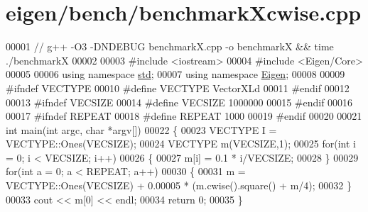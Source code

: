 \hypertarget{eigen_2bench_2benchmark_xcwise_8cpp_source}{}\section{eigen/bench/benchmark\+Xcwise.cpp}
\label{eigen_2bench_2benchmark_xcwise_8cpp_source}

\begin{DoxyCode}
00001 \textcolor{comment}{// g++ -O3 -DNDEBUG benchmarkX.cpp -o benchmarkX && time ./benchmarkX}
00002 
00003 \textcolor{preprocessor}{#include <iostream>}
00004 \textcolor{preprocessor}{#include <Eigen/Core>}
00005 
00006 \textcolor{keyword}{using namespace }\hyperlink{namespacestd}{std};
00007 \textcolor{keyword}{using namespace }\hyperlink{namespace_eigen}{Eigen};
00008 
00009 \textcolor{preprocessor}{#ifndef VECTYPE}
00010 \textcolor{preprocessor}{#define VECTYPE VectorXLd}
00011 \textcolor{preprocessor}{#endif}
00012 
00013 \textcolor{preprocessor}{#ifndef VECSIZE}
00014 \textcolor{preprocessor}{#define VECSIZE 1000000}
00015 \textcolor{preprocessor}{#endif}
00016 
00017 \textcolor{preprocessor}{#ifndef REPEAT}
00018 \textcolor{preprocessor}{#define REPEAT 1000}
00019 \textcolor{preprocessor}{#endif}
00020 
00021 \textcolor{keywordtype}{int} main(\textcolor{keywordtype}{int} argc, \textcolor{keywordtype}{char} *argv[])
00022 \{
00023     VECTYPE I = VECTYPE::Ones(VECSIZE);
00024     VECTYPE m(VECSIZE,1);
00025     \textcolor{keywordflow}{for}(\textcolor{keywordtype}{int} i = 0; i < VECSIZE; i++)
00026     \{
00027         m[i] = 0.1 * i/VECSIZE;
00028     \}
00029     \textcolor{keywordflow}{for}(\textcolor{keywordtype}{int} a = 0; a < REPEAT; a++)
00030     \{
00031         m = VECTYPE::Ones(VECSIZE) + 0.00005 * (m.cwise().square() + m/4);
00032     \}
00033     cout << m[0] << endl;
00034     \textcolor{keywordflow}{return} 0;
00035 \}
\end{DoxyCode}
